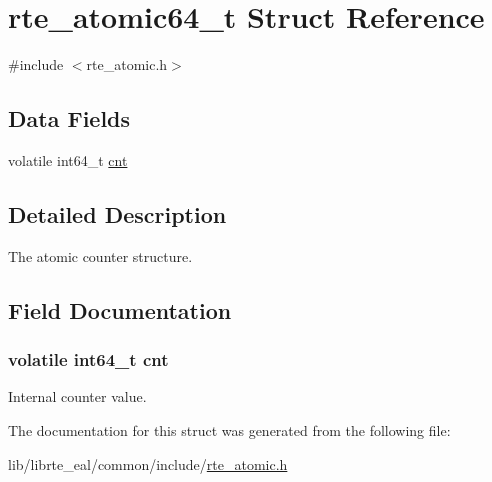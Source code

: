 \hypertarget{structrte__atomic64__t}{}\section{rte\+\_\+atomic64\+\_\+t Struct Reference}
\label{structrte__atomic64__t}


{\ttfamily \#include $<$rte\+\_\+atomic.\+h$>$}

\subsection*{Data Fields}
\begin{DoxyCompactItemize}
\item 
volatile int64\+\_\+t \hyperlink{structrte__atomic64__t_a8475e95a5a1668a80940c22d145009a2}{cnt}
\end{DoxyCompactItemize}


\subsection{Detailed Description}
The atomic counter structure. 

\subsection{Field Documentation}
\hypertarget{structrte__atomic64__t_a8475e95a5a1668a80940c22d145009a2}{}
\subsubsection[{cnt}]{\setlength{\rightskip}{0pt plus 5cm}volatile int64\+\_\+t cnt}\label{structrte__atomic64__t_a8475e95a5a1668a80940c22d145009a2}
Internal counter value. 

The documentation for this struct was generated from the following file\+:\begin{DoxyCompactItemize}
\item 
lib/librte\+\_\+eal/common/include/\hyperlink{rte__atomic_8h}{rte\+\_\+atomic.\+h}\end{DoxyCompactItemize}
